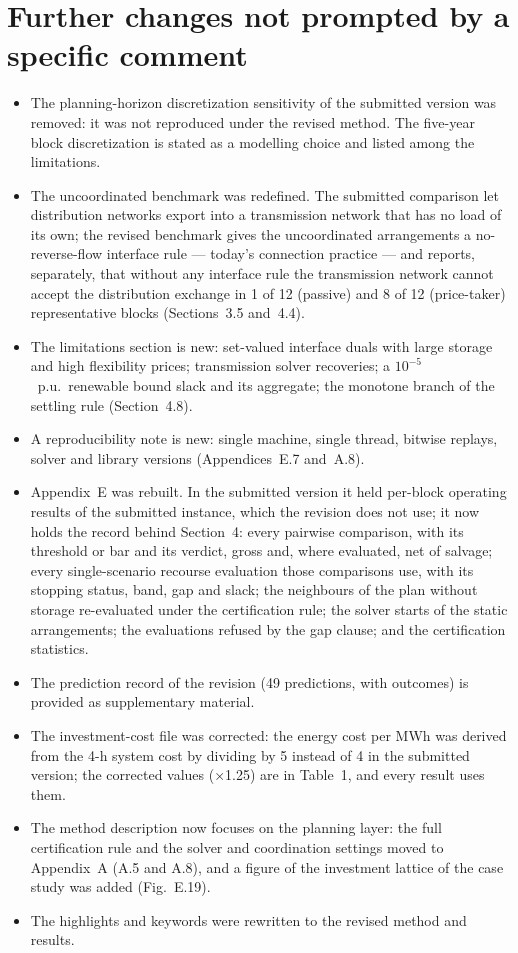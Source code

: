 \documentclass[11pt]{article}
\begin{document}
\section*{Further changes not prompted by a specific comment}

\begin{itemize}[leftmargin=*]
  \item The planning-horizon discretization sensitivity of the submitted version was removed: it was not reproduced under the revised method. The five-year block discretization is stated as a modelling choice and listed among the limitations.
  \item The uncoordinated benchmark was redefined. The submitted comparison let distribution networks export into a transmission network that has no load of its own; the revised benchmark gives the uncoordinated arrangements a no-reverse-flow interface rule --- today's connection practice --- and reports, separately, that without any interface rule the transmission network cannot accept the distribution exchange in 1 of 12 (passive) and 8 of 12 (price-taker) representative blocks (Sections~3.5 and~4.4).
  \item The limitations section is new: set-valued interface duals with large storage and high flexibility prices; transmission solver recoveries; a $10^{-5}$~p.u.\ renewable bound slack and its aggregate; the monotone branch of the settling rule (Section~4.8).
  \item A reproducibility note is new: single machine, single thread, bitwise replays, solver and library versions (Appendices~E.7 and~A.8).
  \item Appendix~E was rebuilt. In the submitted version it held per-block operating results of the submitted instance, which the revision does not use; it now holds the record behind Section~4: every pairwise comparison, with its threshold or bar and its verdict, gross and, where evaluated, net of salvage; every single-scenario recourse evaluation those comparisons use, with its stopping status, band, gap and slack; the neighbours of the plan without storage re-evaluated under the certification rule; the solver starts of the static arrangements; the evaluations refused by the gap clause; and the certification statistics.
  \item The prediction record of the revision (49 predictions, with outcomes) is provided as supplementary material.
  \item The investment-cost file was corrected: the energy cost per MWh was derived from the 4-h system cost by dividing by 5 instead of 4 in the submitted version; the corrected values (×1.25) are in Table~1, and every result uses them.
  \item The method description now focuses on the planning layer: the full certification rule and the solver and coordination settings moved to Appendix~A (A.5 and A.8), and a figure of the investment lattice of the case study was added (Fig.~E.19).
  \item The highlights and keywords were rewritten to the revised method and results.
\end{itemize}
\end{document}
